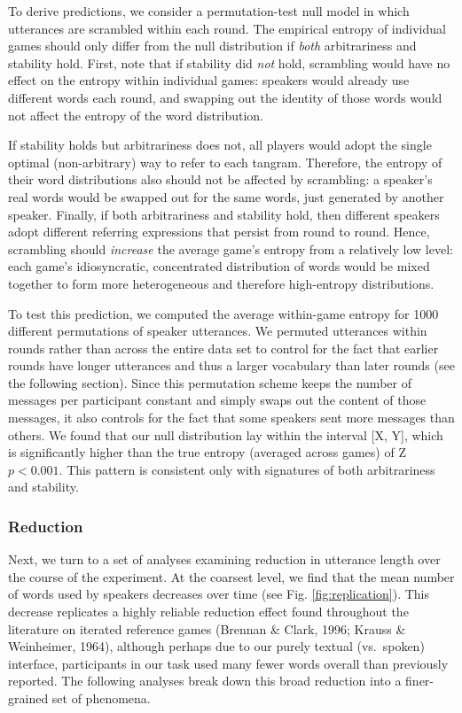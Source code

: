 \documentclass[10pt, letterpaper]{article}
\begin{document}
To derive predictions, we consider a permutation-test null model in
which utterances are scrambled within each round. The empirical entropy
of individual games should only differ from the null distribution if
\emph{both} arbitrariness and stability hold. First, note that if
stability did \emph{not} hold, scrambling would have no effect on the
entropy within individual games: speakers would already use different
words each round, and swapping out the identity of those words would not
affect the entropy of the word distribution.

If stability holds but arbitrariness does not, all players would adopt
the single optimal (non-arbitrary) way to refer to each tangram.
Therefore, the entropy of their word distributions also should not be
affected by scrambling: a speaker's real words would be swapped out for
the same words, just generated by another speaker. Finally, if both
arbitrariness and stability hold, then different speakers adopt
different referring expressions that persist from round to round. Hence,
scrambling should \emph{increase} the average game's entropy from a
relatively low level: each game's idiosyncratic, concentrated
distribution of words would be mixed together to form more heterogeneous
and therefore high-entropy distributions.

To test this prediction, we computed the average within-game entropy for
1000 different permutations of speaker utterances. We permuted
utterances within rounds rather than across the entire data set to
control for the fact that earlier rounds have longer utterances and thus
a larger vocabulary than later rounds (see the following section). Since
this permutation scheme keeps the number of messages per participant
constant and simply swaps out the content of those messages, it also
controls for the fact that some speakers sent more messages than others.
We found that our null distribution lay within the interval {[}X, Y{]},
which is significantly higher than the true entropy (averaged across
games) of Z \(p < 0.001\). This pattern is consistent only with
signatures of both arbitrariness and stability.

\subsubsection{Reduction}\label{reduction}

Next, we turn to a set of analyses examining reduction in utterance
length over the course of the experiment. At the coarsest level, we find
that the mean number of words used by speakers decreases over time (see
Fig. \ref{fig:replication}). This decrease replicates a highly reliable
reduction effect found throughout the literature on iterated reference
games (Brennan \& Clark, 1996; Krauss \& Weinheimer, 1964), although
perhaps due to our purely textual (vs.~spoken) interface, participants
in our task used many fewer words overall than previously reported. The
following analyses break down this broad reduction into a finer-grained
set of phenomena.
\end{document}
